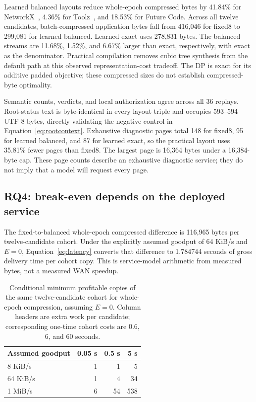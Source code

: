 Learned balanced layouts reduce whole-epoch compressed bytes by 41.84\% for NetworkX~\cite{networkx}, 4.36\% for Toolz~\cite{toolz}, and 18.53\% for Future Code. Across all twelve candidates, batch-compressed application bytes fall from 416,046 for fixed8 to 299,081 for learned balanced. Learned exact uses 278,831 bytes. The balanced streams are 11.68\%, 1.52\%, and 6.67\% larger than exact, respectively, with exact as the denominator. Practical compilation removes cubic tree synthesis from the default path at this observed representation-cost tradeoff. The DP is exact for its additive padded objective; these compressed sizes do not establish compressed-byte optimality.

Semantic counts, verdicts, and local authorization agree across all 36 replays. Root-status text is byte-identical in every layout triple and occupies 593--594 UTF-8 bytes, directly validating the negative control in Equation~\eqref{eq:rootcontext}. Exhaustive diagnostic pages total 148 for fixed8, 95 for learned balanced, and 87 for learned exact, so the practical layout uses 35.81\% fewer pages than fixed8. The largest page is 16,364 bytes under a 16,384-byte cap. These page counts describe an exhaustive diagnostic service; they do not imply that a model will request every page.

\subsection{RQ4: break-even depends on the deployed service}
The fixed-to-balanced whole-epoch compressed difference is 116,965 bytes per twelve-candidate cohort. Under the explicitly assumed goodput of 64 KiB/s and $E=0$, Equation~\eqref{eq:latency} converts that difference to 1.784744 seconds of gross delivery time per cohort copy. This is service-model arithmetic from measured bytes, not a measured WAN speedup.

\begin{table}[H]\centering\small
\caption{Conditional minimum profitable copies of the same twelve-candidate cohort for whole-epoch compression, assuming $E=0$. Column headers are extra work per candidate; corresponding one-time cohort costs are 0.6, 6, and 60 seconds.}\label{tab:payback}
\begin{tabular}{@{}lrrr@{}}\toprule
Assumed goodput & 0.05 s & 0.5 s & 5 s\\\midrule
8 KiB/s & 1 & 1 & 5\\
64 KiB/s & 1 & 4 & 34\\
1 MiB/s & 6 & 54 & 538\\\bottomrule
\end{tabular}
\end{table}

